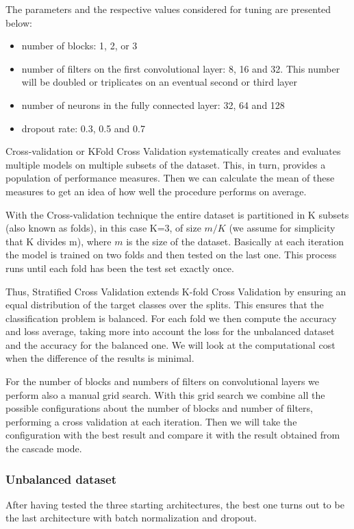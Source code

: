 \documentclass{article}
\begin{document}
The parameters and the respective values considered for tuning are presented below:
\begin{itemize}
    \item number of blocks: 1, 2, or 3
    \item number of filters on the first convolutional layer: 8, 16 and 32. This number will be doubled or triplicates on an eventual second or third layer
    \item number of neurons in the fully connected layer: 32, 64 and 128
    \item dropout rate: 0.3, 0.5 and 0.7
\end{itemize}

Cross-validation or KFold Cross Validation systematically creates and evaluates multiple models on multiple subsets of the dataset. This, in turn, provides a population of performance measures. Then we can calculate the mean of these measures to get an idea of how well the procedure performs on average.

With the Cross-validation technique the entire dataset is partitioned in K subsets (also known as folds), in this case K=3, of size $m/K$ (we assume for simplicity that K divides m), where $m$ is the size of the dataset. Basically at each iteration the model is trained on two folds and then tested on the last one. This process runs until each fold has been the test set exactly once.

Thus, Stratified Cross Validation extends K-fold Cross Validation by ensuring an equal distribution of the target classes over the splits. This ensures that the classification problem is balanced.
For each fold we then compute the accuracy and loss average, taking more into account the loss for the unbalanced dataset and the accuracy for the balanced one. We will look at the computational cost when the difference of the results is minimal.

For the number of blocks and numbers of filters on convolutional layers we perform also a manual grid search. With this grid search we combine all the possible configurations about the number of blocks and number of filters, performing a cross validation at each iteration. Then we will take the configuration with the best result and compare it with the result obtained from the cascade mode.

\subsubsection{Unbalanced dataset}
After having tested the three starting architectures, the best one turns out to be the last architecture with batch normalization and dropout.
\end{document}

